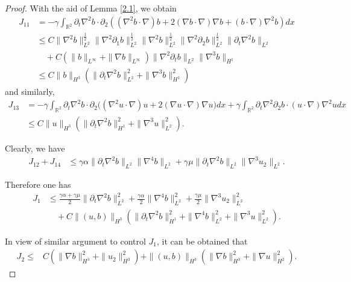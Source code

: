 \documentclass[reqno,11pt]{amsart}
\def\R{\mathbb R}
\numberwithin{Thm}{section}
\begin{document}
\begin{proof}
With the aid of Lemma \ref{2.1}, we obtain
\begin{align*}
J_{11}
&=-\gamma\int_{\R^2}\partial_t\nabla^2 b\cdot\partial_2((\nabla^2b\cdot\nabla)b+2(\nabla b\cdot\nabla)\nabla b+(b\cdot\nabla)\nabla^2 b)dx\nonumber\\
&\leq C\|\nabla^2 b\|_{L^{2}}^{\frac{1}{2}}\|\nabla^2\partial_1 b\|_{L^{2}}^{\frac{1}{2}}\|\nabla^2 b\|_{L^{2}}^{\frac{1}{2}}\|\nabla^2 \partial_2 b\|_{L^{2}}^{\frac{1}{2}}\|\partial_t\nabla^2 b\|_{L^{2}}\nonumber\\
&\quad+C(\| b\|_{L^{\infty}}+\|\nabla b\|_{L^{\infty}})\|\nabla^2 \partial_tb\|_{L^{2}}\|\nabla^3 b\|_{H^{1}}\nonumber\\
&\leq C\| b\|_{H^{3}}(\|\partial_t\nabla^2 b\|_{L^{2}}^2+\|\nabla^3 b\|_{H^{1}}^2)
\end{align*}
and similarly,
\begin{align*}
J_{13}&=-\gamma\int_{\R^2}\partial_t\nabla^2b\cdot\partial_2\big((\nabla^2u\cdot\nabla)u+2(\nabla u\cdot\nabla)\nabla u\big)dx+\gamma\int_{\R^2}\partial_t\nabla^2\partial_2 b\cdot(u\cdot\nabla)\nabla^2udx\nonumber\\
&\leq C\| u\|_{H^{3}}\left(\|\partial_t\nabla^2  b\|_{H^{1}}^2+\|\nabla^3 u\|_{L^{2}}^2\right).
\end{align*}


Clearly, we have
\begin{align*}
J_{12}+J_{14}
&\leq \gamma\alpha\|\partial_t\nabla^2b\|_{L^2}\|\nabla^4 b\|_{L^2}+\gamma\mu\|\partial_t\nabla^2b\|_{L^2}\|\nabla^3u_2\|_{L^2}.
\end{align*}

Therefore one has
\begin{align}\label{JJJ1}
J_{1}&\leq \frac{\gamma\alpha+\gamma\mu}{2}\|\partial_t\nabla^2 b\|_{L^2}^2+\frac{\gamma\alpha}{2}\|\nabla^4 b\|_{L^2}^2+\frac{\gamma\mu}{2}\|\nabla^3u_2\|_{L^2}^2\nonumber\\
&\quad+ C\| (u,b)\|_{H^{3}}\left(\|\partial_t\nabla^2 b\|_{H^1}^2+\|\nabla^4 b\|_{L^2}^2+\|\nabla^3u\|_{L^2}^2\right).
\end{align}

In view of similar argument to control $J_{1}$, it can be obtained that
\begin{align*}
J_{2}\leq&C\left(\|\nabla b\|_{H^3}^2+\|u_2\|_{H^3}^2\right)+ \| (u,b)\|_{H^{3}}\left(\|\nabla b\|_{H^{3}}^2+\|\nabla u\|_{H^{2}}^2\right).
\end{align*}



\end{proof}
\end{document}
